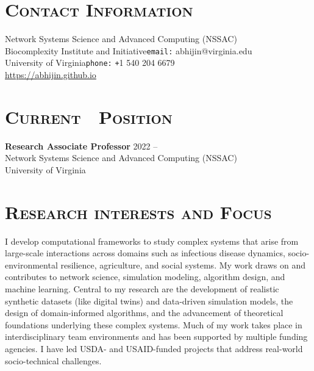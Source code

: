 \documentclass[margin,10pt]{res} %
\begin{document}
\begin{resume}

\section{\textnormal{\textsc{Contact Information}}}
Network Systems Science and Advanced Computing (NSSAC)\\
Biocomplexity Institute and Initiative\hfill \texttt{email:}
abhijin@virginia.edu\hspace{0mm}\mbox{}\\
University of Virginia\hfill \texttt{phone:}
\texttt{+}1 540 204 6679\hspace{6.5mm}\mbox{}\\
\url{https://abhijin.github.io}
\section{\textnormal{\textsc{Current\,\,\,\, Position}}}
\textbf{Research Associate Professor} \hfill 2022 -- \\
Network Systems Science and Advanced Computing (NSSAC)\\
University of Virginia
\section{\textnormal{\textsc{Research interests and Focus}}}
I develop computational frameworks to study complex systems that arise from
large-scale interactions across domains such as infectious disease
dynamics, socio-environmental resilience, agriculture, and social systems.
My work draws on and contributes to network science, simulation modeling,
algorithm design, and machine learning. Central to my research are the
development of realistic synthetic datasets (like digital twins) and
data-driven simulation models, the design of domain-informed algorithms,
and the advancement of theoretical foundations underlying these complex
systems. Much of my work takes place in interdisciplinary team environments
and has been supported by multiple funding agencies. I have led USDA- and
USAID-funded projects that address real-world socio-technical challenges.\\


\end{resume}
\end{document}
